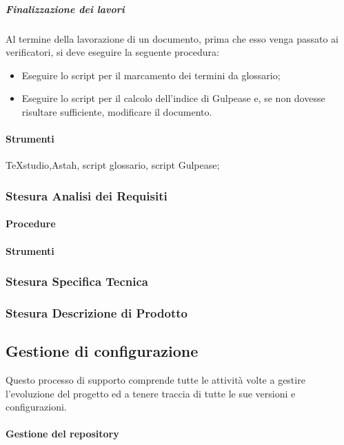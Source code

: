\subparagraph{Finalizzazione dei lavori}
Al termine della lavorazione di un documento, prima che esso venga passato ai verificatori, si deve eseguire la seguente procedura:
\begin{itemize}
\item Eseguire lo script per il marcamento dei termini da glossario;
\item Eseguire lo script per il calcolo dell'indice di Gulpease e, se non dovesse risultare sufficiente, modificare il documento.
\end{itemize}

\paragraph{Strumenti}
TeXstudio,Astah, script glossario, script Gulpease;

\subsubsection{Stesura Analisi dei Requisiti}
\paragraph{Procedure}
\paragraph{Strumenti}

\subsubsection{Stesura Specifica Tecnica}

\subsubsection{Stesura Descrizione di Prodotto}



\subsection{Gestione di configurazione}
Questo processo di supporto comprende tutte le attività volte a gestire l'evoluzione del progetto ed a tenere traccia di tutte le sue versioni e configurazioni.

\paragraph{Gestione del repository}


